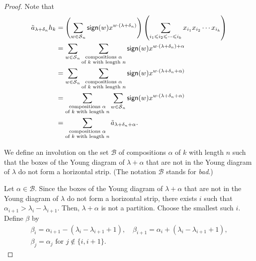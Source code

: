 \begin{proof}
    Note that
    \begin{align}
        \tilde{a}_{\lambda + \delta_n} h_k
        &=
        \left(
            \sum_{w \in \operatorname{\mathcal{S}}_n} \operatorname{\mathsf{sign}}(w) x^{w \cdot (\lambda + \delta_n)} 
        \right) 
        \left(
            \sum_{i_1 \leqslant i_2 \leqslant \cdots \leqslant i_k} x_{i_1} x_{i_2} \cdots x_{i_k}
        \right) \\
        &=
        \sum_{w \in \operatorname{\mathcal{S}}_n}
        \sum_{\substack{\text{compositions } \alpha \\ \text{of } k \text{ with length } n}}
        \operatorname{\mathsf{sign}}(w) x^{w \cdot (\lambda + \delta_n) + \alpha} \\
        &=
        \sum_{w \in \operatorname{\mathcal{S}}_n}
        \sum_{\substack{\text{compositions } \alpha \\ \text{of } k \text{ with length } n}}
        \operatorname{\mathsf{sign}}(w) x^{w \cdot (\lambda + \delta_n + \alpha)} \\
        &=
        \sum_{\substack{\text{compositions } \alpha \\ \text{of } k \text{ with length } n}}
        \sum_{w \in \operatorname{\mathcal{S}}_n}
        \operatorname{\mathsf{sign}}(w) x^{w \cdot (\lambda + \delta_n + \alpha)} \\
        &=
        \sum_{\substack{\text{compositions } \alpha \\ \text{of } k \text{ with length } n}}
        \tilde{a}_{\lambda + \delta_n + \alpha}.
    \end{align}

    We define an involution on the set \(\mathcal{B}\) of compositions \(\alpha\) of \(k\) with length \(n\) such that the boxes of the Young diagram of \(\lambda + \alpha\) that are not in the Young diagram of \(\lambda\) do not form a horizontal strip.
    (The notation \(\mathcal{B}\) stands for \emph{bad}.)

    Let \(\alpha \in \mathcal{B}\).
    Since the boxes of the Young diagram of \(\lambda + \alpha\) that are not in the Young diagram of \(\lambda\) do not form a horizontal strip,
    there exists \(i\) such that
    \(\alpha_{i+1} > \lambda_i - \lambda_{i+1}\).
    Then, \(\lambda + \alpha\) is not a partition.
    Choose the smallest such \(i\).
    Define \(\beta\) by
    \begin{gather}
        \beta_i = \alpha_{i+1} - (\lambda_i - \lambda_{i+1} + 1), \quad
        \beta_{i+1} = \alpha_i + (\lambda_i - \lambda_{i+1} + 1), \\
        \beta_j = \alpha_j \text{ for } j \notin \{i, i+1\}.
    \end{gather}


\end{proof}
